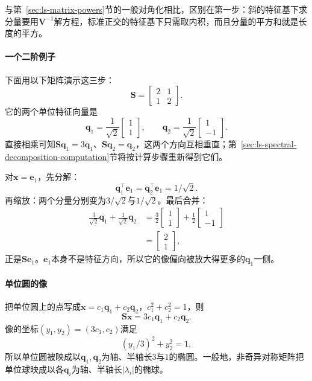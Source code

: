 与第~\ref{sec:ls-matrix-powers}节的一般对角化相比，区别在第一步：斜的特征基下求分量要用$\bm V^{-1}$解方程，标准正交的特征基下只需取内积，而且分量的平方和就是长度的平方。

\paragraph{一个二阶例子}
下面用以下矩阵演示这三步：
\[
 \bm S=\begin{bmatrix}2&1\\1&2\end{bmatrix}.
\]
它的两个单位特征向量是
\[
 \bm q_1=\frac1{\sqrt2}\begin{bmatrix}1\\1\end{bmatrix},\qquad
 \bm q_2=\frac1{\sqrt2}\begin{bmatrix}1\\-1\end{bmatrix}.
\]
直接相乘可知$\bm S\bm q_1=3\bm q_1$、$\bm S\bm q_2=\bm q_2$，这两个方向互相垂直；第~\ref{sec:ls-spectral-decomposition-computation}节将按计算步骤重新得到它们。

对$\bm x=\bm e_1$，先分解：
\[
 \bm q_1^\top\bm e_1=\bm q_2^\top\bm e_1=1/\sqrt2 .
\]
再缩放：两个分量分别变为$3/\sqrt2$与$1/\sqrt2$。最后合并：
\[
 \begin{aligned}
 \frac3{\sqrt2}\bm q_1+\frac1{\sqrt2}\bm q_2
 &=\frac32\begin{bmatrix}1\\1\end{bmatrix}+\frac12\begin{bmatrix}1\\-1\end{bmatrix}\\
 &=\begin{bmatrix}2\\1\end{bmatrix},
 \end{aligned}
\]
正是$\bm S\bm e_1$。$\bm e_1$本身不是特征方向，所以它的像偏向被放大得更多的$\bm q_1$一侧。

\paragraph{单位圆的像}
把单位圆上的点写成$\bm x=c_1\bm q_1+c_2\bm q_2$，$c_1^2+c_2^2=1$，则
\[
 \bm S\bm x=3c_1\bm q_1+c_2\bm q_2 .
\]
像的坐标$(y_1,y_2)=(3c_1,c_2)$满足
\[
 (y_1/3)^2+y_2^2=1,
\]
所以单位圆被映成以$\bm q_1,\bm q_2$为轴、半轴长$3$与$1$的椭圆。一般地，非奇异对称矩阵把单位球映成以各$\bm q_i$为轴、半轴长$|\lambda_i|$的椭球。

